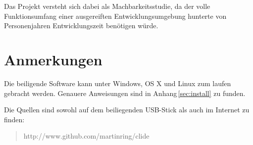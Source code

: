 Das Projekt versteht sich dabei als Machbarkeitsstudie, da der volle Funktionsumfang einer
ausgereiften Entwicklungsumgebung hunterte von Personenjahren Entwicklungszeit benötigen würde.

\section{Anmerkungen}

Die beiligende Software kann unter Windows, OS X und Linux zum laufen gebracht werden. Genauere
Anweisungen sind in Anhang\,\ref{sec:install} zu funden.

Die Quellen sind sowohl auf dem beiliegenden USB-Stick als auch im Internet zu finden:

\begin{quote}
http://www.github.com/martinring/clide
\end{quote}
